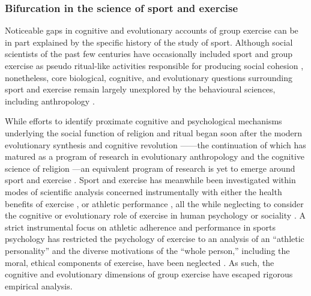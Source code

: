\begin{CJK}{UTF8}{gbsn}
\subsubsection{Bifurcation in the science of sport and exercise}

Noticeable gaps in cognitive and evolutionary accounts of group exercise can be in part explained by the specific history of the study of sport.  Although social scientists of the past few centuries have occasionally included sport and group exercise as pseudo ritual-like activities responsible for producing social cohesion \citep{Durkheim1965,Mauss1935,Turner1977}, nonetheless, core biological, cognitive, and evolutionary questions surrounding sport and exercise remain largely unexplored by the behavioural sciences, including anthropology \citep{Blanchard1995,Downey2005a}.

While efforts to identify proximate cognitive and psychological mechanisms underlying the social function of religion and ritual began soon after the modern evolutionary synthesis \citep{Huxley1942} and cognitive revolution \citep[e.g.,][]{Turner1986,1987}—---the continuation of which has matured as a program of research in evolutionary anthropology and the cognitive science of religion \citep{Barrett2002,Lawson1993,Sperber1996,Whitehouse2004}---an equivalent program of research is yet to emerge around sport and exercise \citep{Blanchard1995,Downey2005a}.  Sport and exercise has meanwhile been investigated within modes of scientific analysis concerned instrumentally with either the health benefits of exercise \citep{Fiuza-Luces2013,Morris1994}, or athletic performance \citep{Beedie2015a}, all the while neglecting to consider the cognitive or evolutionary role of exercise in human psychology or sociality \citep{Balish2013,Coulter2015}. A strict instrumental focus on athletic adherence and performance in sports psychology has restricted the psychology of exercise to an analysis of an ``athletic personality'' and the diverse motivations of the ``whole person,'' including the moral, ethical components of exercise, have been neglected \citep{Coulter2015,Laborde2014}.  As such, the cognitive and evolutionary dimensions of group exercise have escaped rigorous empirical analysis.


\end{CJK}
